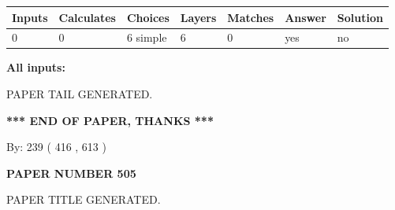 \documentclass[12pt]{article}
\begin{document}
   
\noindent\begin{tabular}{|l|l|l|l|l|l|l|}
 \hline
Inputs & Calculates & Choices & Layers & Matches & Answer & Solution \\ \hline
 0  & 
 0  & 
 6
  simple  
  & 
 6  & 
 0  & 
  yes & 
  no 
  \\ \hline
 \end{tabular}
   
   
   
   
\noindent{}
   
   
   
   
\noindent\vspace{0.1in}\hspace{-0.08in} {\textbf{\Large{All inputs: }}}
   
   
   
   
   
   
 \vspace{0.2in}
 
   
   
\vspace{2.0in} PAPER TAIL GENERATED.
   
   
   
   
\vspace{1.0in} 
{\textbf{\large{ *** END OF PAPER, THANKS *** }}} 
   
   
\hspace{1.0in} By: 
 239 ( 416 ,  613 )
   
   
   
   
\newpage 
\setcounter{page}{ 
   505001 } 
   
   
   
   
 {\textbf{ \Large{ PAPER NUMBER  505  }}}
   
   
\vspace{0.2in}
   
   
   
   
   
   
   
   
 \vspace{0.2in}
 
 
 
 
   
   
 PAPER TITLE GENERATED.
   
   
   
\vspace{0.2in}
   
\end{document}
